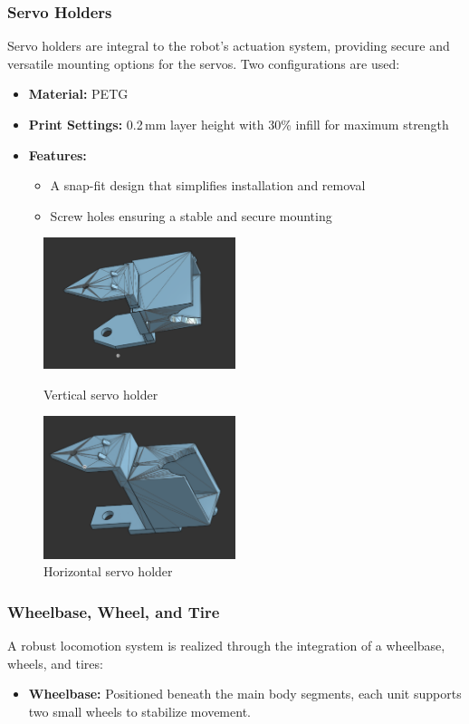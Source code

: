 \documentclass[12pt,a4paper]{report}
\begin{document}
\FloatBarrier
\subsubsection{Servo Holders}
Servo holders are integral to the robot's actuation system, providing secure and versatile mounting options for the servos. Two configurations are used:
\begin{itemize}
    \item \textbf{Material:} PETG
    \item \textbf{Print Settings:} 0.2\,mm layer height with 30\% infill for maximum strength
    \item \textbf{Features:}
    \begin{itemize}
        \item A snap-fit design that simplifies installation and removal
        \item Screw holes ensuring a stable and secure mounting
    \end{itemize}
\end{itemize}

\begin{figure}[H]
\centering
\includegraphics[width=0.5\textwidth]{media/Vertical-holder.png}
\caption{Vertical servo holder}
\par\vspace{4 mm}
\includegraphics[width=0.5\textwidth]{media/Horizontal-holder.png}
\caption{Horizontal servo holder}
\end{figure}

\FloatBarrier
\subsubsection{Wheelbase, Wheel, and Tire}
A robust locomotion system is realized through the integration of a wheelbase, wheels, and tires:
\begin{itemize}
    \item \textbf{Wheelbase:} Positioned beneath the main body segments, each unit supports two small wheels to stabilize movement.
\end{itemize}
\end{document}
